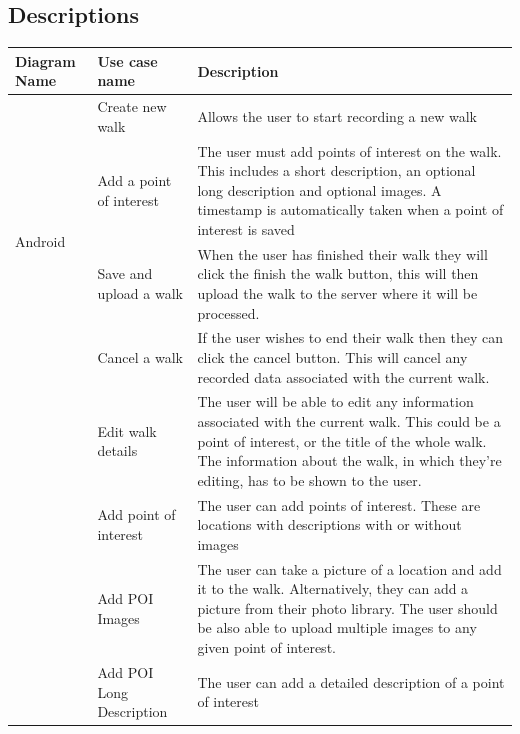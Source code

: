 \documentclass[12pt]{article}
\begin{document}
\subsection{Descriptions}
\setlength\LTleft{-1cm}
\begin{longtable}{|p{2cm}|p{3cm}|p{10cm}|}
\hline
	Diagram Name & Use case name  & Description \\
\hline

 \multirow{4}{*}{Android} & \multicolumn{1}{|p{3cm}|}{Create new walk} & \multicolumn{1}{|p{10cm}|}{Allows the user to start recording a new walk} \\\cline{2-3} & \multicolumn{1}{|p{3cm}|}{Add a point of interest
} & \multicolumn{1}{|p{10cm}|}{The user must add points of interest on the walk. This includes a short description, an optional long description and optional images. A timestamp is automatically taken when a point of interest is saved}
\\\cline{2-3} & \multicolumn{1}{|p{3cm}|}{Save and upload a walk} & \multicolumn{1}{|p{10cm}|}{When the user has finished their walk they will click the finish the walk button, this will then upload the walk to the server where it will be processed.}
\\\cline{2-3} & \multicolumn{1}{|p{3cm}|}{Cancel a walk} & \multicolumn{1}{|p{10cm}|}{If the user wishes to end their walk then they can click the cancel button. This will cancel any recorded data associated with the current walk.}
\\\cline{2-3} & \multicolumn{1}{|p{3cm}|}{Edit walk details} & \multicolumn{1}{|p{10cm}|}{The user will be able to edit any information associated with the current walk. This could be a point of interest, or the title of the whole walk. The information about the walk, in which they're editing, has to be shown to the user.}
\\\cline{2-3} & \multicolumn{1}{|p{3cm}|}{Add point of interest} & \multicolumn{1}{|p{10cm}|}{The user can add points of interest. These are locations with descriptions with or without images}
\\\cline{2-3} & \multicolumn{1}{|p{3cm}|}{Add POI Images} & \multicolumn{1}{|p{10cm}|}{The user can take a picture of a location and add it to the walk. Alternatively, they can add a picture from their photo library. The user should be also able to upload multiple images to any given point of interest.}
\\\cline{2-3} & \multicolumn{1}{|p{3cm}|}{Add POI Long Description} & \multicolumn{1}{|p{10cm}|}{The user can add a detailed description of a point of interest}

\end{longtable}
\end{document}
